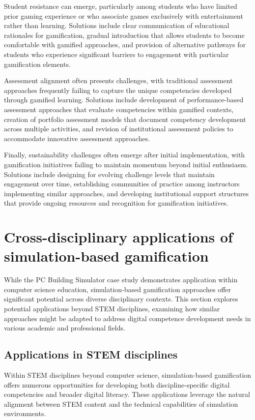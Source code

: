 \documentclass[cte]{acnsart}
\begin{document}
Student resistance can emerge, particularly among students who have limited prior gaming experience or who associate games exclusively with entertainment rather than learning. Solutions include clear communication of educational rationales for gamification, gradual introduction that allows students to become comfortable with gamified approaches, and provision of alternative pathways for students who experience significant barriers to engagement with particular gamification elements.

Assessment alignment often presents challenges, with traditional assessment approaches frequently failing to capture the unique competencies developed through gamified learning. Solutions include development of performance-based assessment approaches that evaluate competencies within gamified contexts, creation of portfolio assessment models that document competency development across multiple activities, and revision of institutional assessment policies to accommodate innovative assessment approaches.

Finally, sustainability challenges often emerge after initial implementation, with gamification initiatives failing to maintain momentum beyond initial enthusiasm. Solutions include designing for evolving challenge levels that maintain engagement over time, establishing communities of practice among instructors implementing similar approaches, and developing institutional support structures that provide ongoing resources and recognition for gamification initiatives.

\section{Cross-disciplinary applications of simulation-based gamification\label{sec6}}

While the PC Building Simulator case study demonstrates application within computer science education, simulation-based gamification approaches offer significant potential across diverse disciplinary contexts. This section explores potential applications beyond STEM disciplines, examining how similar approaches might be adapted to address digital competence development needs in various academic and professional fields.

\subsection{Applications in STEM disciplines}

Within STEM disciplines beyond computer science, simulation-based gamification offers numerous opportunities for developing both discipline-specific digital competencies and broader digital literacy. These applications leverage the natural alignment between STEM content and the technical capabilities of simulation environments.
\end{document}
